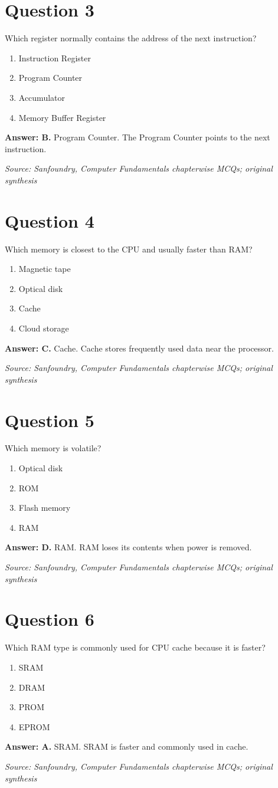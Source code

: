\documentclass[11pt,a4paper]{book}
\newcommand{\source}[1]{\par\smallskip\textit{Source: #1}}
\newcommand{\answer}[2]{\par\textbf{Answer: #1.} #2}
\begin{document}
\section*{Question 3}
Which register normally contains the address of the next instruction?
\begin{enumerate}[label=\Alph*.]
\item Instruction Register
\item Program Counter
\item Accumulator
\item Memory Buffer Register
\end{enumerate}
\answer{B}{Program Counter. The Program Counter points to the next instruction.}
\source{Sanfoundry, Computer Fundamentals chapterwise MCQs; original synthesis}
\section*{Question 4}
Which memory is closest to the CPU and usually faster than RAM?
\begin{enumerate}[label=\Alph*.]
\item Magnetic tape
\item Optical disk
\item Cache
\item Cloud storage
\end{enumerate}
\answer{C}{Cache. Cache stores frequently used data near the processor.}
\source{Sanfoundry, Computer Fundamentals chapterwise MCQs; original synthesis}
\section*{Question 5}
Which memory is volatile?
\begin{enumerate}[label=\Alph*.]
\item Optical disk
\item ROM
\item Flash memory
\item RAM
\end{enumerate}
\answer{D}{RAM. RAM loses its contents when power is removed.}
\source{Sanfoundry, Computer Fundamentals chapterwise MCQs; original synthesis}
\section*{Question 6}
Which RAM type is commonly used for CPU cache because it is faster?
\begin{enumerate}[label=\Alph*.]
\item SRAM
\item DRAM
\item PROM
\item EPROM
\end{enumerate}
\answer{A}{SRAM. SRAM is faster and commonly used in cache.}
\source{Sanfoundry, Computer Fundamentals chapterwise MCQs; original synthesis}
\end{document}
